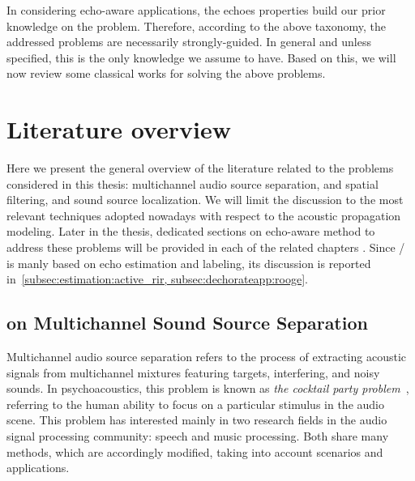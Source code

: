 \mynewline
In considering echo-aware applications, the echoes properties build our prior knowledge on the problem.
Therefore, according to the above taxonomy, the addressed problems are necessarily strongly-guided.
In general and unless specified, this is the only knowledge we assume to have.
Based on this, we will now review some classical works for solving the above problems.


\section{Literature overview}\label{sec:application:sota}
Here we present the general overview of the literature related to the problems considered in this thesis: multichannel audio source separation, and spatial filtering, and sound source localization.
We will limit the discussion to the most relevant techniques adopted nowadays with respect to the acoustic propagation modeling.
Later in the thesis, dedicated sections on echo-aware method to address these problems will be provided in each of the related chapters .
Since \RooGE/ is manly based on echo estimation and labeling, its discussion is reported in~\cref{subsec:estimation:active_rir, subsec:dechorateapp:rooge}.

\subsection{on Multichannel Sound Source Separation}
Multichannel audio source separation refers to the process of extracting acoustic signals from multichannel mixtures featuring targets, interfering, and noisy sounds.
In psychoacoustics, this problem is known as \textit{the cocktail party problem}~, referring to the human ability to focus on a particular stimulus in the audio scene.
This problem has interested mainly in two research fields in the audio signal processing community: speech and music processing.
Both share many methods, which are accordingly modified, taking into account scenarios and applications.

